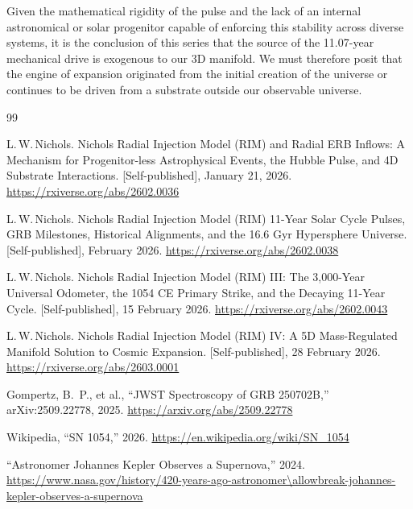 \documentclass[12pt]{article}
\begin{document}
Given the mathematical rigidity of the pulse and the lack of an internal astronomical or solar progenitor capable of enforcing this stability across diverse systems, it is the conclusion of this series that the source of the 11.07-year mechanical drive is exogenous to our 3D manifold. We must therefore posit that the engine of expansion originated from the initial creation of the universe or continues to be driven from a substrate outside our observable universe.

\begin{thebibliography}{99}

L.\,W.\,Nichols.
Nichols Radial Injection Model (RIM) and Radial ERB Inflows: A Mechanism for Progenitor-less Astrophysical Events, the Hubble Pulse, and 4D Substrate Interactions.
[Self-published], January 21, 2026.
\newline
\url{https://rxiverse.org/abs/2602.0036}

L.\,W.\,Nichols.
Nichols Radial Injection Model (RIM) 11-Year Solar Cycle Pulses, GRB Milestones, Historical Alignments, and the 16.6 Gyr Hypersphere Universe.
[Self-published], February 2026.
\newline
\url{https://rxiverse.org/abs/2602.0038}

L.\,W.\,Nichols.
Nichols Radial Injection Model (RIM) III: The 3,000-Year Universal Odometer, the 1054 CE Primary Strike, and the Decaying 11-Year Cycle.
[Self-published], 15 February 2026.
\newline
\url{https://rxiverse.org/abs/2602.0043}

L.\,W.\,Nichols.
Nichols Radial Injection Model (RIM) IV: A 5D Mass-Regulated Manifold Solution to Cosmic Expansion.
[Self-published], 28 February 2026.
\newline
\url{https://rxiverse.org/abs/2603.0001}

Gompertz, B.\ P., et al.,
``JWST Spectroscopy of GRB 250702B,''
arXiv:2509.22778, 2025.
\newline
\url{https://arxiv.org/abs/2509.22778}

Wikipedia,
``SN 1054,''
2026.
\newline
\url{https://en.wikipedia.org/wiki/SN_1054}

``Astronomer Johannes Kepler Observes a Supernova,''
2024.
\newline
\url{https://www.nasa.gov/history/420-years-ago-astronomer\allowbreak-johannes-kepler-observes-a-supernova}


\end{thebibliography}
\end{document}
